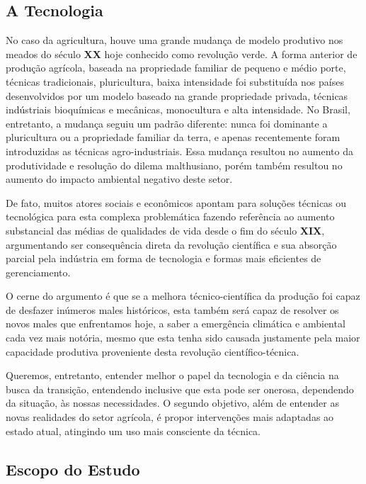 \documentclass[14pt,a4paper]{article}
\begin{document}
	\subsection{A Tecnologia}
	
		No caso da agricultura, houve uma grande mudança de modelo produtivo nos meados do século \textbf{XX} hoje conhecido como revolução verde. A forma anterior de produção agrícola, baseada na propriedade familiar de pequeno e médio porte, técnicas tradicionais, pluricultura, baixa intensidade foi substituída nos países desenvolvidos por um modelo baseado na grande propriedade privada, técnicas indústriais bioquímicas e mecânicas, monocultura e alta intensidade. No Brasil, entretanto, a mudança seguiu um padrão diferente: nunca foi dominante a pluricultura ou a propriedade familiar da terra, e apenas recentemente foram introduzidas as técnicas agro-industriais. Essa mudança resultou no aumento da produtividade e resolução do dilema malthusiano, porém também resultou no aumento do impacto ambiental negativo deste setor.
		
		De fato, muitos atores sociais e econômicos apontam para soluções técnicas ou tecnológica para esta complexa problemática fazendo referência ao aumento substancial das médias de qualidades de vida desde o fim do século \textbf{XIX}, argumentando ser consequência direta da revolução científica e sua absorção parcial pela indústria em forma de tecnologia e formas mais eficientes de gerenciamento. 
		
		O cerne do argumento é que se a melhora técnico-científica da produção foi capaz de desfazer inúmeros males históricos, esta também será capaz de resolver os novos males que enfrentamos hoje, a saber a emergência climática e ambiental cada vez mais notória, mesmo que esta tenha sido causada justamente pela maior capacidade produtiva proveniente desta revolução científico-técnica. 

		Queremos, entretanto, entender melhor o papel da tecnologia e da ciência na busca da transição, entendendo inclusive que esta pode ser onerosa, dependendo da situação, às nossas necessidades. O segundo objetivo, além de entender as novas realidades do setor agrícola, é propor intervenções mais adaptadas ao estado atual, atingindo um uso mais consciente da técnica.
	
	\subsection{Escopo do Estudo}
\end{document}
